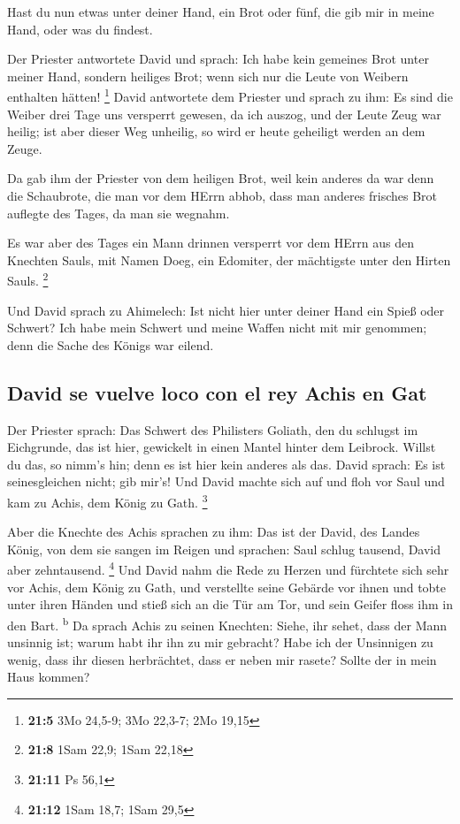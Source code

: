  Hast du nun etwas unter deiner Hand, ein Brot oder fünf,
die gib mir in meine Hand, oder was du findest.

 Der Priester antwortete David und sprach: Ich habe kein
gemeines Brot unter meiner Hand, sondern heiliges Brot; wenn sich nur
die Leute von Weibern enthalten hätten! \footnote{\textbf{21:5} 3Mo
  24,5-9; 3Mo 22,3-7; 2Mo 19,15}  David antwortete dem
Priester und sprach zu ihm: Es sind die Weiber drei Tage uns versperrt
gewesen, da ich auszog, und der Leute Zeug war heilig; ist aber dieser
Weg unheilig, so wird er heute geheiligt werden an dem Zeuge.

 Da gab ihm der Priester von dem heiligen Brot, weil kein
anderes da war denn die Schaubrote, die man vor dem HErrn abhob, dass
man anderes frisches Brot auflegte des Tages, da man sie wegnahm.

 Es war aber des Tages ein Mann drinnen versperrt vor dem
HErrn aus den Knechten Sauls, mit Namen Doeg, ein Edomiter, der
mächtigste unter den Hirten Sauls. \footnote{\textbf{21:8} 1Sam 22,9;
  1Sam 22,18}

 Und David sprach zu Ahimelech: Ist nicht hier unter
deiner Hand ein Spieß oder Schwert? Ich habe mein Schwert und meine
Waffen nicht mit mir genommen; denn die Sache des Königs war eilend.

\hypertarget{david-se-vuelve-loco-con-el-rey-achis-en-gat}{%
\subsection{David se vuelve loco con el rey Achis en
Gat}\label{david-se-vuelve-loco-con-el-rey-achis-en-gat}}

 Der Priester sprach: Das Schwert des Philisters Goliath,
den du schlugst im Eichgrunde, das ist hier, gewickelt in einen Mantel
hinter dem Leibrock. Willst du das, so nimm's hin; denn es ist hier kein
anderes als das. David sprach: Es ist seinesgleichen nicht; gib mir's!
 Und David machte sich auf und floh vor Saul und kam zu
Achis, dem König zu Gath. \footnote{\textbf{21:11} Ps 56,1}

 Aber die Knechte des Achis sprachen zu ihm: Das ist der
David, des Landes König, von dem sie sangen im Reigen und sprachen: Saul
schlug tausend, David aber zehntausend. \footnote{\textbf{21:12} 1Sam
  18,7; 1Sam 29,5}  Und David nahm die Rede zu Herzen und
fürchtete sich sehr vor Achis, dem König zu Gath,  und
verstellte seine Gebärde vor ihnen und tobte unter ihren Händen und
stieß sich an die Tür am Tor, und sein Geifer floss ihm in den Bart.
\textsuperscript{b}  Da sprach Achis zu seinen Knechten:
Siehe, ihr sehet, dass der Mann unsinnig ist; warum habt ihr ihn zu mir
gebracht?  Habe ich der Unsinnigen zu wenig, dass ihr
diesen herbrächtet, dass er neben mir rasete? Sollte der in mein Haus
kommen?

